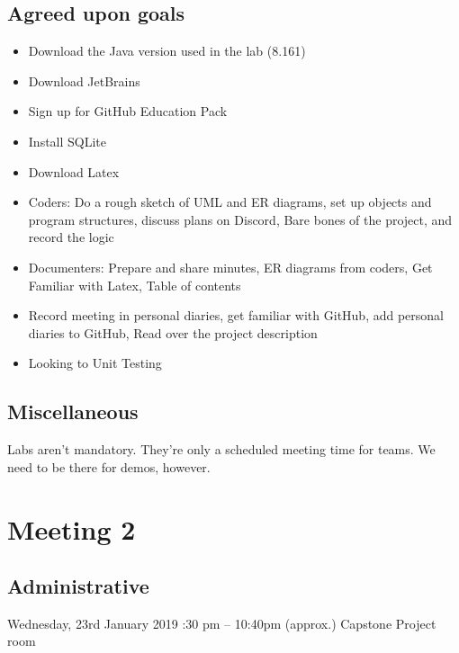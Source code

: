 \documentclass[12pt]{article}
\begin{document}
	\subsection{Agreed upon goals}
	\begin{itemize}
		\item Download the Java version used in the lab (8.161) 
		\item Download JetBrains 
		\item Sign up for GitHub Education Pack 
		\item Install SQLite 
		\item Download Latex 
		\item Coders: Do a rough sketch of UML and ER diagrams, set up objects and program structures, discuss plans on Discord, Bare bones of the project, and record the logic 
		\item Documenters: Prepare and share minutes, ER diagrams from coders, Get Familiar with Latex, Table of contents 
		\item Record meeting in personal diaries, get familiar with GitHub, add personal diaries to GitHub, Read over the project description 
		\item Looking to Unit Testing 
	\end{itemize}
	
	\subsection{Miscellaneous}
		Labs aren’t mandatory. They’re only a scheduled meeting time for teams. We need to be there for demos, however.
	\pagebreak
	
	\section{Meeting 2}
	
	\subsection{Administrative}
	Wednesday, 23rd January 2019 :30 pm – 10:40pm (approx.) \textbar Capstone Project room 
\end{document}
